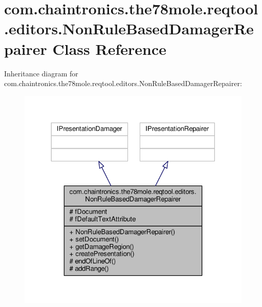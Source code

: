 \hypertarget{classcom_1_1chaintronics_1_1the78mole_1_1reqtool_1_1editors_1_1NonRuleBasedDamagerRepairer}{}\section{com.\+chaintronics.\+the78mole.\+reqtool.\+editors.\+Non\+Rule\+Based\+Damager\+Repairer Class Reference}
\label{classcom_1_1chaintronics_1_1the78mole_1_1reqtool_1_1editors_1_1NonRuleBasedDamagerRepairer}


Inheritance diagram for com.\+chaintronics.\+the78mole.\+reqtool.\+editors.\+Non\+Rule\+Based\+Damager\+Repairer\+:\nopagebreak
\begin{figure}[H]
\begin{center}
\leavevmode
\includegraphics[width=324pt]{d2/d6c/classcom_1_1chaintronics_1_1the78mole_1_1reqtool_1_1editors_1_1NonRuleBasedDamagerRepairer__inherit__graph}
\end{center}
\end{figure}


